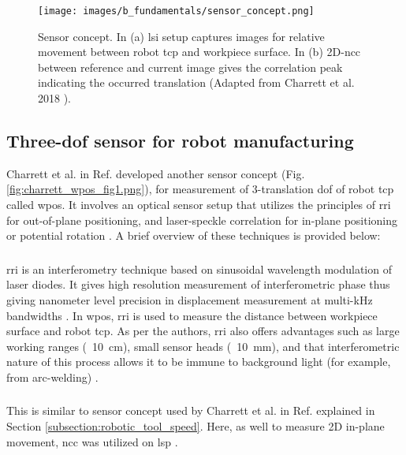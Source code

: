         \begin{figure}[ht]
            \centering
            \texttt{[image: images/b\_fundamentals/sensor\_concept.png]}
            \caption{Sensor concept. In (a) \gls{lsi} setup captures images for relative movement between robot \gls{tcp} and workpiece surface. In (b) 2D-\gls{ncc} between reference and current image gives the correlation peak indicating the occurred translation (Adapted from Charrett et al. 2018 \cite{charrett_2018}).}
            \label{fig:sensor_concept.png}
        \end{figure}

    \subsection{Three-\gls{dof} sensor for robot manufacturing}
        Charrett et al. in Ref. \cite{charrett_wpos} developed another sensor concept (Fig. \ref{fig:charrett_wpos_fig1.png}), for measurement of 3-translation \gls{dof} of robot \gls{tcp} called \gls{wpos}. It involves an optical sensor setup that utilizes the principles of \gls{rri} \cite{kissinger_rri} for out-of-plane positioning, and laser-speckle correlation for in-plane positioning or potential rotation \cite{charrett_2019}. A brief overview of these techniques is provided below:

        \subsubsection{}
            \gls{rri} is an interferometry technique based on sinusoidal wavelength modulation of laser diodes. It gives high resolution measurement of interferometric phase thus giving nanometer level precision in displacement measurement at multi-kHz bandwidths \cite{kissinger_rri}. In \gls{wpos}, \gls{rri} is used to measure the distance between workpiece surface and robot \gls{tcp}. As per the authors, \gls{rri} also offers advantages such as large working ranges (\geq\ \SI{10}{\centi\meter}), small sensor heads (\leq\ \SI{10}{\milli\meter}), and that interferometric nature of this process allows it to be immune to background light (for example, from arc-welding) \cite{kissinger_rri}.

        \subsubsection{}
            This is similar to sensor concept used by Charrett et al. in Ref. \cite{charrett_2018} explained in Section \ref{subsection:robotic_tool_speed}. Here, as well to measure 2D in-plane movement, \gls{ncc} was utilized on \gls{lsp} \cite{charrett_wpos}.

